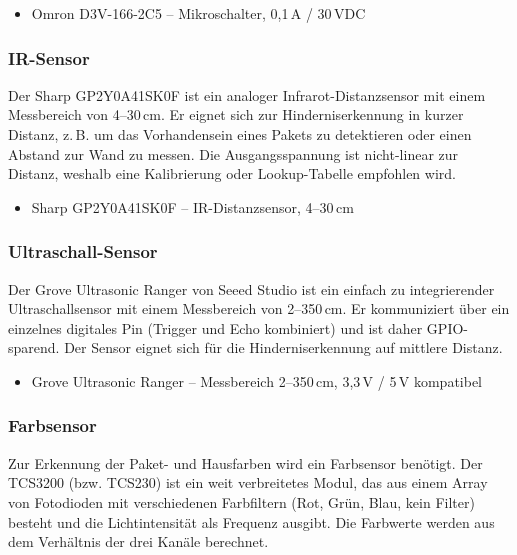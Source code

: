 \documentclass[12pt,a4paper]{article}
\begin{document}
	\begin{itemize}
		\item Omron D3V-166-2C5 \cite{digikey_omron} -- Mikroschalter, 0,1\,A / 30\,VDC
	\end{itemize}
	
	\subsubsection{IR-Sensor}
	
	Der Sharp GP2Y0A41SK0F ist ein analoger Infrarot-Distanzsensor mit einem Messbereich von 4--30\,cm. Er eignet sich zur Hinderniserkennung in kurzer Distanz, z.\,B. um das Vorhandensein eines Pakets zu detektieren oder einen Abstand zur Wand zu messen. Die Ausgangsspannung ist nicht-linear zur Distanz, weshalb eine Kalibrierung oder Lookup-Tabelle empfohlen wird.
	
	\begin{itemize}
		\item Sharp GP2Y0A41SK0F \cite{digikey_sharp_ir} -- IR-Distanzsensor, 4--30\,cm
	\end{itemize}
	
	\subsubsection{Ultraschall-Sensor}
	
	Der Grove Ultrasonic Ranger von Seeed Studio ist ein einfach zu integrierender Ultraschallsensor mit einem Messbereich von 2--350\,cm. Er kommuniziert über ein einzelnes digitales Pin (Trigger und Echo kombiniert) und ist daher GPIO-sparend. Der Sensor eignet sich für die Hinderniserkennung auf mittlere Distanz.
	
	\begin{itemize}
		\item Grove Ultrasonic Ranger \cite{seeed_ultrasonic} -- Messbereich 2--350\,cm, 3,3\,V / 5\,V kompatibel
	\end{itemize}
	
	\subsubsection{Farbsensor}
	
	Zur Erkennung der Paket- und Hausfarben wird ein Farbsensor benötigt. Der TCS3200 (bzw. TCS230) ist ein weit verbreitetes Modul, das aus einem Array von Fotodioden mit verschiedenen Farbfiltern (Rot, Grün, Blau, kein Filter) besteht und die Lichtintensität als Frequenz ausgibt. Die Farbwerte werden aus dem Verhältnis der drei Kanäle berechnet.
	
\end{document}

